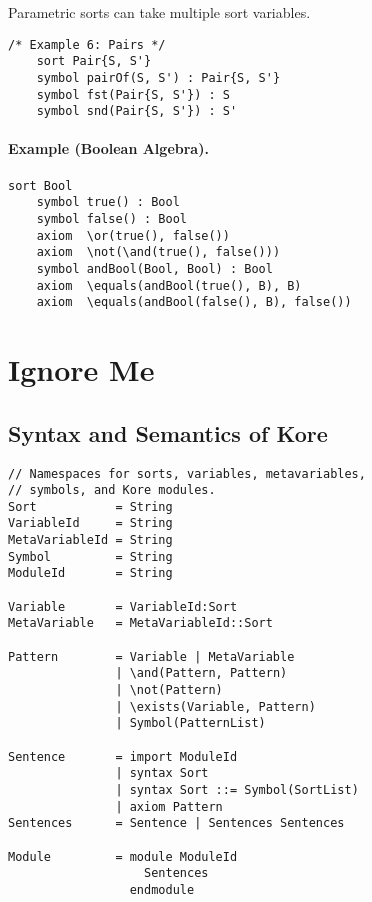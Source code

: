 \documentclass[UTF8]{article}
\theoremstyle{plain}
\theoremstyle{definition}
\theoremstyle{remark}
\begin{document}
Parametric sorts can take multiple sort variables.
\begin{Verbatim}[fontsize=\small]
    /* Example 6: Pairs */
    sort Pair{S, S'}
    symbol pairOf(S, S') : Pair{S, S'}
    symbol fst(Pair{S, S'}) : S
    symbol snd(Pair{S, S'}) : S'  
\end{Verbatim}

\paragraph{Example (Boolean Algebra).}
\begin{Verbatim}[fontsize=\small]
    sort Bool
    symbol true() : Bool
    symbol false() : Bool
    axiom  \or(true(), false())
    axiom  \not(\and(true(), false()))
    symbol andBool(Bool, Bool) : Bool
    axiom  \equals(andBool(true(), B), B)
    axiom  \equals(andBool(false(), B), false())
\end{Verbatim}



\section{Ignore Me}

\subsection{Syntax and Semantics of Kore}
\label{sec:syntax-of-kore}

\begin{Verbatim}[fontsize=\small]
// Namespaces for sorts, variables, metavariables,
// symbols, and Kore modules.
Sort           = String
VariableId     = String
MetaVariableId = String
Symbol         = String
ModuleId       = String

Variable       = VariableId:Sort
MetaVariable   = MetaVariableId::Sort

Pattern        = Variable | MetaVariable
               | \and(Pattern, Pattern)
               | \not(Pattern)
               | \exists(Variable, Pattern)
               | Symbol(PatternList)

Sentence       = import ModuleId
               | syntax Sort
               | syntax Sort ::= Symbol(SortList)
               | axiom Pattern
Sentences      = Sentence | Sentences Sentences

Module         = module ModuleId
                   Sentences
                 endmodule
\end{Verbatim}
\end{document}
